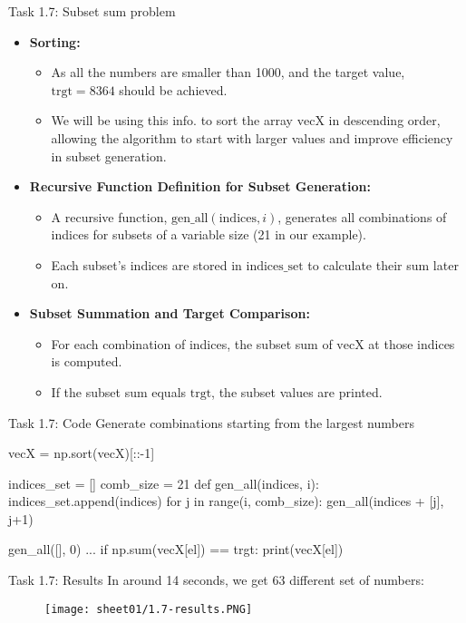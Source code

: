 \documentclass[aspectratio=169]{beamer}
\begin{document}
\begin{frame}{Task 1.7: Subset sum problem}

    \begin{itemize}
        \item \textbf{Sorting:}
        \begin{itemize}
            \item As all the numbers are smaller than 1000, and the target value, \( \text{trgt} = 8364 \) should be achieved.
            \item We will be using this info. to sort the array \( \text{vecX} \) in descending order, allowing the algorithm to start with larger values and improve efficiency in subset generation.
        \end{itemize}

        \item \textbf{Recursive Function Definition for Subset Generation:}
        \begin{itemize}
            \item A recursive function, \( \text{gen\_all}(\text{indices}, i) \), generates all combinations of indices for subsets of a variable size (21 in our example).
            \item Each subset's indices are stored in \( \text{indices\_set} \) to calculate their sum later on.
        \end{itemize}

        \item \textbf{Subset Summation and Target Comparison:}
        \begin{itemize}
            \item For each combination of indices, the subset sum of \( \text{vecX} \) at those indices is computed.
            \item If the subset sum equals \( \text{trgt} \), the subset values are printed.
        \end{itemize}
    \end{itemize}

\end{frame}

\begin{frame}[fragile]{Task 1.7: Code}
    Generate combinations starting from the largest numbers
    \begin{mylisting}
    vecX = np.sort(vecX)[::-1]

    indices_set = []
    comb_size = 21
    def gen_all(indices, i):
      indices_set.append(indices)
      for j in range(i, comb_size):
        gen_all(indices + [j], j+1)

    gen_all([], 0)
    ...
    if np.sum(vecX[el]) == trgt:
        print(vecX[el])
    \end{mylisting}

\end{frame}

\begin{frame}{Task 1.7: Results}
In around 14 seconds, we get 63 different set of numbers:
\begin{figure}
    \centering
    \texttt{[image: sheet01/1.7-results.PNG]}
    \label{fig:enter-label}
\end{figure}
\end{frame}
\end{document}
